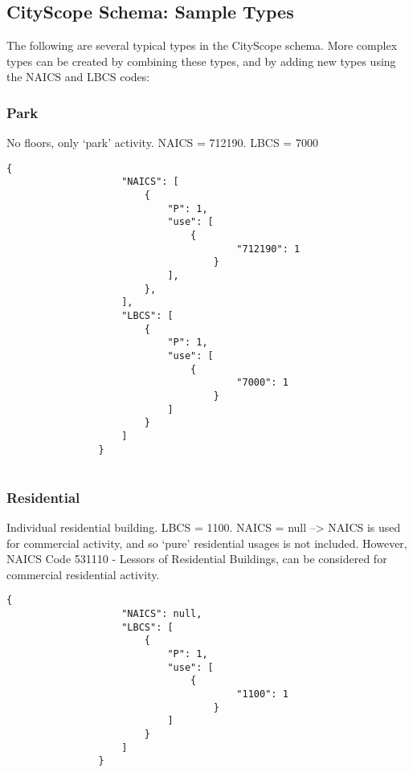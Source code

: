 {    \subsection{CityScope Schema: Sample Types}\label{appendix:sample-cs-types}
    {
        The following are several typical types in the CityScope schema. More complex types can be created by combining these types, and by adding new types using the NAICS and LBCS codes:

        \subsubsection{Park}\label{park}
        {
            No floors, only `park' activity. NAICS = 712190. LBCS = 7000

            \begin{Verbatim}[baselinestretch=0.75, tabsize=4, fontsize=\small]
                {
                    "NAICS": [
                        {
                            "P": 1,
                            "use": [
                                {
                                        "712190": 1
                                    }
                            ],
                        },
                    ],   
                    "LBCS": [
                        {
                            "P": 1,
                            "use": [
                                {
                                        "7000": 1
                                    }
                            ]
                        }
                    ]
                }
                
            \end{Verbatim}

        }
        \subsubsection{Residential}\label{household-activities-residential-activities}

        {
            Individual residential building. LBCS = 1100. NAICS = null  --> NAICS is used for commercial activity, and so `pure' residential usages is not included. However, NAICS Code 531110 - Lessors of Residential Buildings, can be considered for commercial residential activity.

            \begin{Verbatim}[baselinestretch=0.75, tabsize=4, fontsize=\small]
                {
                    "NAICS": null,
                    "LBCS": [
                        {
                            "P": 1,
                            "use": [
                                {
                                        "1100": 1
                                    }
                            ]
                        }
                    ]
                }
            \end{Verbatim}
        }

}}
